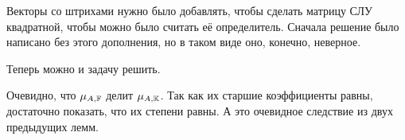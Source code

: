 \begin{remark}
    Векторы со штрихами нужно было добавлять, чтобы сделать матрицу СЛУ квадратной, чтобы можно было считать её определитель. Сначала решение было написано без этого дополнения, но в таком виде оно, конечно, неверное.
\end{remark}

Теперь можно и задачу решить.

\begin{solution}
    Очевидно, что $\mu_{A, \mathbb{F}}$ делит $\mu_{A, \mathbb{K}}$. Так как их старшие коэффициенты равны, достаточно показать, что их степени равны. А это очевидное следствие из двух предыдущих лемм.
\end{solution}

